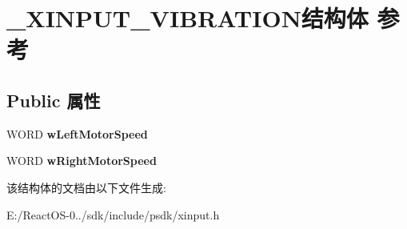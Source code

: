 \hypertarget{struct___x_i_n_p_u_t___v_i_b_r_a_t_i_o_n}{}\section{\+\_\+\+X\+I\+N\+P\+U\+T\+\_\+\+V\+I\+B\+R\+A\+T\+I\+O\+N结构体 参考}
\label{struct___x_i_n_p_u_t___v_i_b_r_a_t_i_o_n}
\subsection*{Public 属性}
\begin{DoxyCompactItemize}
\item 
\mbox{\label{struct___x_i_n_p_u_t___v_i_b_r_a_t_i_o_n_a6ce4ae9b5c5ac18dc476f7e5098e0661}} 
W\+O\+RD {\bfseries w\+Left\+Motor\+Speed}
\item 
\mbox{\label{struct___x_i_n_p_u_t___v_i_b_r_a_t_i_o_n_a0e06981a411d51f7b107863f8d92bfcb}} 
W\+O\+RD {\bfseries w\+Right\+Motor\+Speed}
\end{DoxyCompactItemize}


该结构体的文档由以下文件生成\+:\begin{DoxyCompactItemize}
\item 
E\+:/\+React\+O\+S-\/0../sdk/include/psdk/xinput.\+h\end{DoxyCompactItemize}
